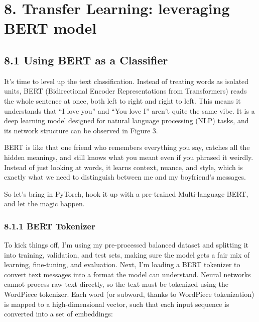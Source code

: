 \documentclass[11pt]{article}
\begin{document}
    \section{8. Transfer Learning: leveraging BERT
model}\label{transfer-learning-leveraging-bert-model}

\subsection{8.1 Using BERT as a
Classifier}\label{using-bert-as-a-classifier}

It's time to level up the text classification. Instead of treating words
as isolated units, BERT (Bidirectional Encoder Representations from
Transformers) reads the whole sentence at once, both left to right and
right to left. This means it understands that ``I love you'' and ``You
love I'' aren't quite the same vibe. It is a deep learning model
designed for natural language processing (NLP) tasks, and its network
structure can be observed in Figure 3.

BERT is like that one friend who remembers everything you say, catches
all the hidden meanings, and still knows what you meant even if you
phrased it weirdly. Instead of just looking at words, it learns context,
nuance, and style, which is exactly what we need to distinguish between
me and my boyfriend's messages.

So let's bring in PyTorch, hook it up with a pre-trained Multi-language
BERT, and let the magic happen.

\subsubsection{8.1.1 BERT Tokenizer}\label{bert-tokenizer}

To kick things off, I'm using my pre-processed balanced dataset and
splitting it into training, validation, and test sets, making sure the
model gets a fair mix of learning, fine-tuning, and evaluation. Next,
I'm loading a BERT tokenizer to convert text messages into a format the
model can understand. Neural networks cannot process raw text directly,
so the text must be tokenized using the WordPiece tokenizer. Each word
(or subword, thanks to WordPiece tokenization) is mapped to a
high-dimensional vector, such that each input sequence is converted into
a set of embeddings:
\end{document}
